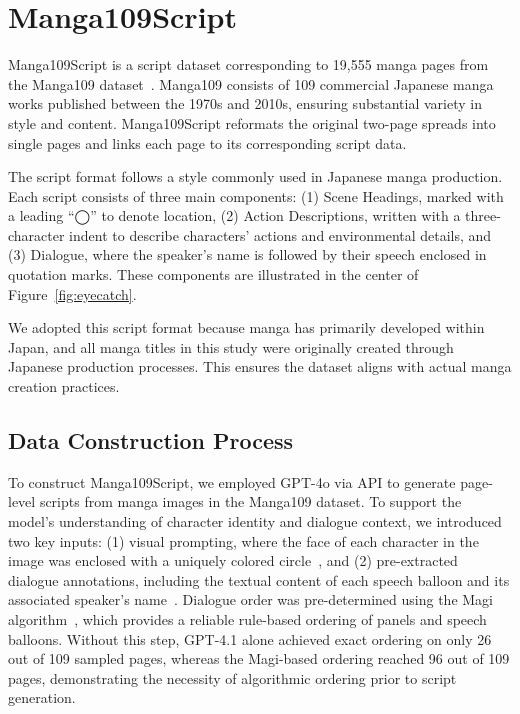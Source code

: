 \section{Manga109Script}
Manga109Script is a script dataset corresponding to 19,555 manga pages from the Manga109 dataset~\cite{matsui2017sketch,aizawa_building_2020}. Manga109 consists of 109 commercial Japanese manga works published between the 1970s and 2010s, ensuring substantial variety in style and content. Manga109Script reformats the original two-page spreads into single pages and links each page to its corresponding script data.

The script format follows a style commonly used in Japanese manga production. Each script consists of three main components:
(1) Scene Headings, marked with a leading “◯” to denote location,
(2) Action Descriptions, written with a three-character indent to describe characters’ actions and environmental details, and
(3) Dialogue, where the speaker’s name is followed by their speech enclosed in quotation marks.
These components are illustrated in the center of Figure~\ref{fig:eyecatch}.

We adopted this script format because manga has primarily developed within Japan, and all manga titles in this study were originally created through Japanese production processes. This ensures the dataset aligns with actual manga creation practices.

\subsection{Data Construction Process}
To construct Manga109Script, we employed GPT-4o via API to generate page-level scripts from manga images in the Manga109 dataset. To support the model's understanding of character identity and dialogue context, we introduced two key inputs: (1) visual prompting, where the face of each character in the image was enclosed with a uniquely colored circle~\cite{shtedritski_what_2023}, and (2) pre-extracted dialogue annotations, including the textual content of each speech balloon and its associated speaker's name~\cite{li_manga109dialog_2024}. Dialogue order was pre-determined using the Magi algorithm~\cite{sachdeva_manga_2024}, which provides a reliable rule-based ordering of panels and speech balloons. Without this step, GPT-4.1 alone achieved exact ordering on only 26 out of 109 sampled pages, whereas the Magi-based ordering reached 96 out of 109 pages, demonstrating the necessity of algorithmic ordering prior to script generation.

